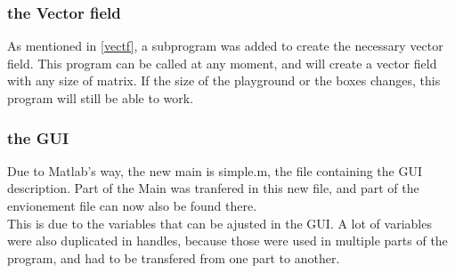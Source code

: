\subsubsection{the Vector field}

As mentioned in \ref{vectf}, a subprogram was added to create the necessary vector field.
This program can be called at any moment, and will create a vector field with any size of matrix.
If the size of the playground or the boxes changes, this program will still be able to work.

\subsubsection{the GUI}

Due to Matlab's way, the new main is simple.m, the file containing the GUI description.
Part of the Main was tranfered in this new file, and part of the envionement file can now also be found there.\\

This is due to the variables that can be ajusted in the GUI.
A lot of variables were also duplicated in handles, because those were used in multiple parts of the program, and had to be transfered from one part to another.
